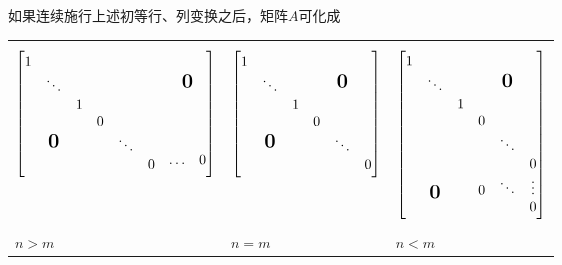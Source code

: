 \documentclass[11pt]{article}
\begin{document}
如果连续施行上述初等行、列变换之后，矩阵\(A\)可化成

 \begin{tabular}{p{4.8cm} p{3.4cm} p{3cm}}
\begin{equation*}
  \begin{bmatrix}
    \begin{matrix}
      1 &&\\&\ddots&\\&&1\\
    \end{matrix}&&\mbox{\normalfont\Large\bfseries 0}\\
    \mbox{\normalfont\Large\bfseries 0}&
    \begin{matrix}
      0&&\\&\ddots&\\&&0\\
    \end{matrix}&
    \begin{matrix}&\\&\\\dots&0
    \end{matrix}
  \end{bmatrix}
\end{equation*}&
\begin{equation*}
  \begin{bmatrix}
    \begin{matrix}
      1 &&\\&\ddots&\\&&1\\
    \end{matrix}&\mbox{\normalfont\Large\bfseries 0}\\
    \mbox{\normalfont\Large\bfseries 0}&
    \begin{matrix}
      0&&\\&\ddots&\\&&0\\
    \end{matrix}
  \end{bmatrix}
\end{equation*}&
\begin{equation*}
  \begin{bmatrix}
    \begin{matrix}
      1 &&\\&\ddots&\\&&1\\
    \end{matrix}&\mbox{\normalfont\Large\bfseries 0}\\&
    \begin{matrix}
      0&&\\
      &\ddots&\\
      &&0\\
    \end{matrix}\\\mbox{\normalfont\Large\bfseries 0}&
    \begin{matrix}
      0&\ddots &\vdots\\& &0
    \end{matrix}
  \end{bmatrix}
\end{equation*}\\
  $n>m$&$n=m$&$n<m$
 \end{tabular}
\end{document}

